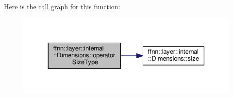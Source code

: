 Here is the call graph for this function\-:\nopagebreak
\begin{figure}[H]
\begin{center}
\leavevmode
\includegraphics[width=330pt]{structffnn_1_1layer_1_1internal_1_1_dimensions_a9f9e33a5d3c0e148f394364ca61e2b66_cgraph}
\end{center}
\end{figure}


